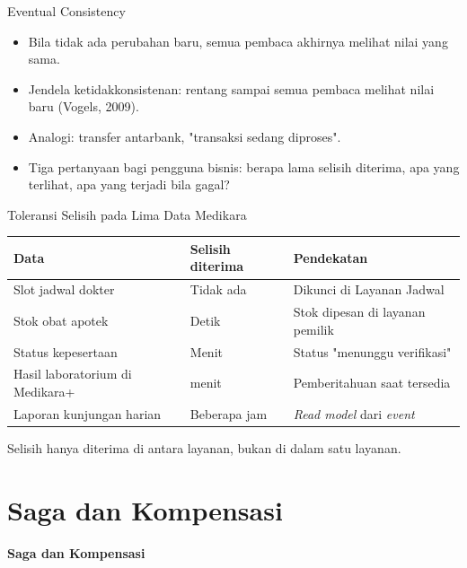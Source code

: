 \documentclass[aspectratio=169, table, 12pt]{beamer}
\begin{document}
\begin{frame}{{\Large Eventual Consistency}}
  \vspace{6pt}
  \small
  \begin{itemize}
    \item Bila tidak ada perubahan baru, semua pembaca akhirnya melihat nilai
          yang sama.
    \item Jendela ketidakkonsistenan: rentang sampai semua pembaca melihat nilai
          baru (Vogels, 2009).
    \item Analogi: transfer antarbank, "transaksi sedang diproses".
    \item Tiga pertanyaan bagi pengguna bisnis: berapa lama selisih diterima,
          apa yang terlihat, apa yang terjadi bila gagal?
  \end{itemize}
\end{frame}

\begin{frame}{{\Large Toleransi Selisih pada Lima Data Medikara}}
  \footnotesize
  \begin{tabularx}{\textwidth}{>{\raggedright\arraybackslash}p{3.6cm}
      >{\raggedright\arraybackslash}p{2.6cm} >{\raggedright\arraybackslash}X}
    \hline
    \textbf{Data} & \textbf{Selisih diterima} & \textbf{Pendekatan} \\
    \hline
    Slot jadwal dokter & Tidak ada & Dikunci di Layanan Jadwal \\
    \hline
    Stok obat apotek & Detik & Stok dipesan di layanan pemilik \\
    \hline
    Status kepesertaan & Menit & Status "menunggu verifikasi" \\
    \hline
    Hasil laboratorium di Medikara+ & 5 menit & Pemberitahuan saat tersedia \\
    \hline
    Laporan kunjungan harian & Beberapa jam & \textit{Read model} dari
      \textit{event} \\
    \hline
  \end{tabularx}

  \vspace{8pt}
  \small
  Selisih hanya diterima di antara layanan, bukan di dalam satu layanan.
\end{frame}

\section{Saga dan Kompensasi}

\begin{frame}{\hfill}
  \centering
  \Huge{\textbf{Saga dan Kompensasi}}
\end{frame}
\end{document}
